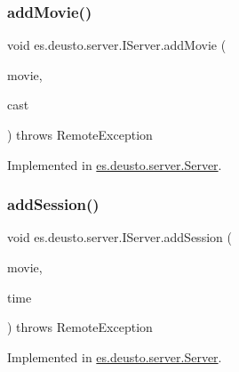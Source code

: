\subsubsection{\texorpdfstring{addMovie()}{addMovie()}\hspace{0.1cm}{\footnotesize\ttfamily [2/2]}}
{\footnotesize\ttfamily void es.\+deusto.\+server.\+I\+Server.\+add\+Movie (\begin{DoxyParamCaption}\item[{\mbox{\hyperlink{classes_1_1deusto_1_1server_1_1data_1_1_movie_d_t_o}{Movie\+D\+TO}}}]{movie,  }\item[{String \mbox{[}$\,$\mbox{]}}]{cast }\end{DoxyParamCaption}) throws Remote\+Exception}



Implemented in \mbox{\hyperlink{classes_1_1deusto_1_1server_1_1_server_ac5b894308dff2d0d47b7c665f190603c}{es.\+deusto.\+server.\+Server}}.

\mbox{\label{interfacees_1_1deusto_1_1server_1_1_i_server_a6dea6fa95033d6339b3da87217adad77}} 
\subsubsection{\texorpdfstring{addSession()}{addSession()}}
{\footnotesize\ttfamily void es.\+deusto.\+server.\+I\+Server.\+add\+Session (\begin{DoxyParamCaption}\item[{\mbox{\hyperlink{classes_1_1deusto_1_1server_1_1data_1_1_movie_d_t_o}{Movie\+D\+TO}}}]{movie,  }\item[{Date}]{time }\end{DoxyParamCaption}) throws Remote\+Exception}



Implemented in \mbox{\hyperlink{classes_1_1deusto_1_1server_1_1_server_a465a6299e03ec7d69ed238cb96292e9c}{es.\+deusto.\+server.\+Server}}.

\mbox{\label{interfacees_1_1deusto_1_1server_1_1_i_server_ac3302c01fefc37a32c0bcbf79fcce44b}} 

